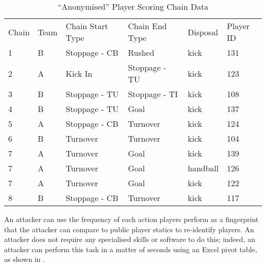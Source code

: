 
\begin{table}[h]
\centering
\caption{``Anonymised'' Player Scoring Chain Data}
\label{tab:chains}
\begin{tabular}{llllll}
Chain & Team & Chain Start Type & Chain End Type & Disposal & Player ID \\
1     & B    & Stoppage - CB    & Rushed         & kick     & 131                  \\
2     & A    & Kick In          & Stoppage - TU  & kick     & 123                  \\
3     & B    & Stoppage - TU    & Stoppage - TI  & kick     & 108                  \\
4     & B    & Stoppage - TU    & Goal           & kick     & 137                  \\
5     & A    & Stoppage - CB    & Turnover       & kick     & 124                  \\
6     & B    & Turnover         & Turnover       & kick     & 104                  \\
7     & A    & Turnover         & Goal           & kick     & 139                  \\
7     & A    & Turnover         & Goal           & handball & 126                  \\
7     & A    & Turnover         & Goal           & kick     & 122                  \\
8     & B    & Stoppage - CB    & Turnover       & kick     & 117
\end{tabular}
\end{table}


An attacker can use the frequency of each action players perform as a fingerprint that the attacker can compare to public player statics to re-identify players. An attacker does not require any specialised skills or software to do this; indeed, an attacker can perform this task in a matter of seconds using an Excel pivot table, as shown in .

